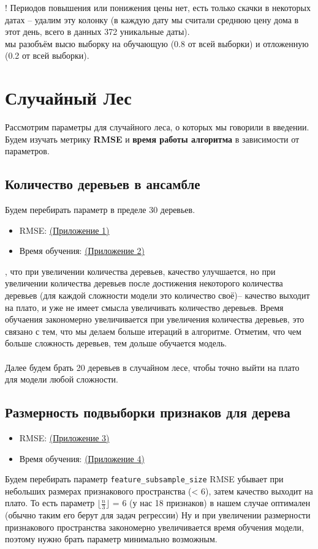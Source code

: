 \documentclass[12pt]{report}
\begin{document}
! Периодов повышения или понижения цены нет, есть только 
скачки в некоторых датах -- удалим эту колонку (в каждую дату мы считали 
среднюю цену дома в этот день, всего в данных 372 уникальные даты). \\

 мы разобъём высю выборку на обучающую (0.8 от всей выборки) и отложенную
(0.2 от всей выборки).


\section{Случайный Лес}
Рассмотрим параметры для случайного леса, о которых мы говорили в введении.
Будем изучать метрику \textbf{RMSE} и \textbf{время работы алгоритма}
в зависимости от параметров.

\subsection{Количество деревьев в ансамбле}
Будем перебирать параметр в пределе 30 деревьев.
\begin{itemize}
    \item RMSE: \hyperref[fig::app1]{(Приложение 1)}
    \item Время обучения: \hyperref[fig::app2]{(Приложение 2)}
\end{itemize}

, что при увеличении количества деревьев, качество улучшается, но 
при увеличении количества деревьев после достижения некоторого количества деревьев 
(для каждой сложности модели это количество своё)-- качество выходит на плато,
и уже не имеет смысла увеличивать количество деревьев. Время обучаения
закономерно увеличивается при увеличения количества деревьев, это связано с тем,
что мы делаем больше итераций в алгоритме. Отметим, что чем больше сложность деревьев,
тем дольше обучается модель. \\\\
Далее будем брать 20 деревьев в случайном лесе, чтобы точно выйти на плато для модели
любой сложности.

\subsection{Размерность подвыборки признаков для дерева}
\begin{itemize}
    \item RMSE: \hyperref[fig::app3]{(Приложение 3)}
    \item Время обучения: \hyperref[fig::app4]{(Приложение 4)}
\end{itemize}
Будем перебирать параметр \verb|feature_subsample_size|
RMSE убывает при небольших размерах признакового пространства (< 6), 
затем качество выходит на плато. То есть параметр $\lfloor \frac{n}{3}\rfloor$ = 6 
(у нас 18 признаков) в нашем случае оптимален (обычно таким его берут для задач регрессии)
Ну и при увеличении размерности признакового пространства закономерно увеличивается
время обучения модели, поэтому нужно брать параметр минимально возможным.
\end{document}
